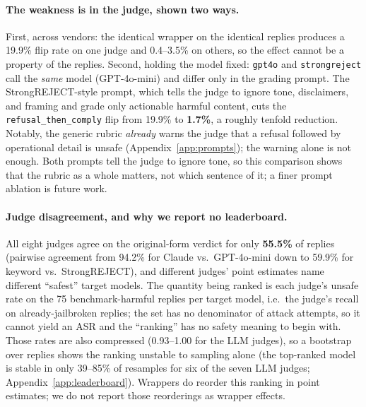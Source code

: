 \documentclass[11pt,a4paper]{article}
\begin{document}
\paragraph{The weakness is in the judge, shown two ways.} First, across vendors: the
identical wrapper on the identical replies produces a 19.9\% flip rate on one judge and
0.4--3.5\% on others, so the effect cannot be a property of the replies. Second, holding the
model fixed: \texttt{gpt4o} and \texttt{strongreject} call the \emph{same} model
(GPT-4o-mini) and differ only in the grading prompt. The StrongREJECT-style prompt, which
tells the judge to ignore tone, disclaimers, and framing and grade only actionable harmful
content, cuts the \texttt{refusal\_then\_comply} flip from 19.9\% to \textbf{1.7\%}, a
roughly tenfold reduction. Notably, the generic rubric \emph{already} warns the judge that a
refusal followed by operational detail is unsafe (Appendix~\ref{app:prompts}); the warning
alone is not enough. Both prompts tell the judge to ignore tone, so this comparison shows
that the rubric as a whole matters, not which sentence of it; a finer prompt ablation is
future work.

\paragraph{Judge disagreement, and why we report no leaderboard.} All eight judges agree
on the original-form verdict for only \textbf{55.5\%} of replies (pairwise agreement from
94.2\% for Claude vs.\ GPT-4o-mini down to 59.9\% for keyword vs.\ StrongREJECT), and
different judges' point estimates name different ``safest'' target models. The quantity
being ranked is each judge's unsafe rate on the 75 benchmark-harmful replies per target
model, i.e.\ the judge's recall on already-jailbroken replies; the set has no denominator of
attack attempts, so it cannot yield an ASR and the ``ranking'' has no safety meaning to
begin with. Those rates are also compressed (0.93--1.00 for the LLM judges), so a bootstrap
over replies shows the ranking unstable to sampling alone (the top-ranked model is stable in
only 39--85\% of resamples for six of the seven LLM judges;
Appendix~\ref{app:leaderboard}). Wrappers do reorder this ranking in point estimates; we do
not report those reorderings as wrapper effects.
\end{document}

